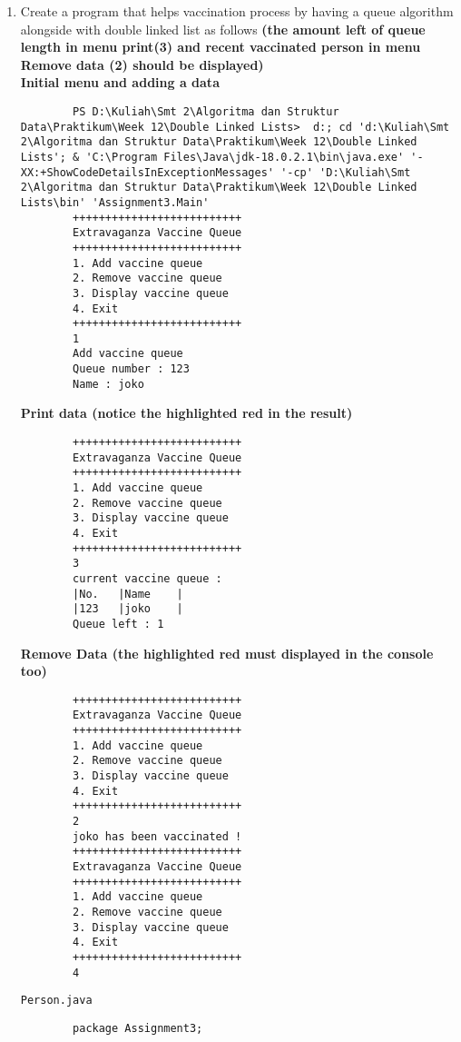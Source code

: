 \documentclass[12pt,titlepage]{article}
\begin{document}
\begin{enumerate}
\begin{verbatim}
    \end{verbatim}
    \item Create a program that helps vaccination process by having a queue algorithm alongside with double linked list as follows \textbf{(the amount left of queue length in menu print(3) and recent vaccinated person in menu Remove data (2) should be displayed)}
    \hbox{}\\\textbf{Initial menu and adding a data}
    \begin{verbatim}
        PS D:\Kuliah\Smt 2\Algoritma dan Struktur Data\Praktikum\Week 12\Double Linked Lists>  d:; cd 'd:\Kuliah\Smt 2\Algoritma dan Struktur Data\Praktikum\Week 12\Double Linked Lists'; & 'C:\Program Files\Java\jdk-18.0.2.1\bin\java.exe' '-XX:+ShowCodeDetailsInExceptionMessages' '-cp' 'D:\Kuliah\Smt 2\Algoritma dan Struktur Data\Praktikum\Week 12\Double Linked Lists\bin' 'Assignment3.Main' 
        ++++++++++++++++++++++++++
        Extravaganza Vaccine Queue
        ++++++++++++++++++++++++++
        1. Add vaccine queue
        2. Remove vaccine queue
        3. Display vaccine queue
        4. Exit
        ++++++++++++++++++++++++++
        1
        Add vaccine queue
        Queue number : 123
        Name : joko
    \end{verbatim}
    \textbf{Print data (notice the highlighted red in the result)}
    \begin{verbatim}
        ++++++++++++++++++++++++++
        Extravaganza Vaccine Queue
        ++++++++++++++++++++++++++
        1. Add vaccine queue
        2. Remove vaccine queue
        3. Display vaccine queue
        4. Exit
        ++++++++++++++++++++++++++
        3
        current vaccine queue : 
        |No.   |Name    |
        |123   |joko    |
        Queue left : 1
    \end{verbatim}
    \textbf{Remove Data (the highlighted red must displayed in the console too)}
    \begin{verbatim}
        ++++++++++++++++++++++++++
        Extravaganza Vaccine Queue
        ++++++++++++++++++++++++++
        1. Add vaccine queue
        2. Remove vaccine queue
        3. Display vaccine queue
        4. Exit
        ++++++++++++++++++++++++++
        2
        joko has been vaccinated !
        ++++++++++++++++++++++++++
        Extravaganza Vaccine Queue
        ++++++++++++++++++++++++++
        1. Add vaccine queue
        2. Remove vaccine queue
        3. Display vaccine queue
        4. Exit
        ++++++++++++++++++++++++++
        4
    \end{verbatim}
    \texttt{Person.java}
    \begin{verbatim}
        package Assignment3;


\end{verbatim}
\end{enumerate}
\end{document}
